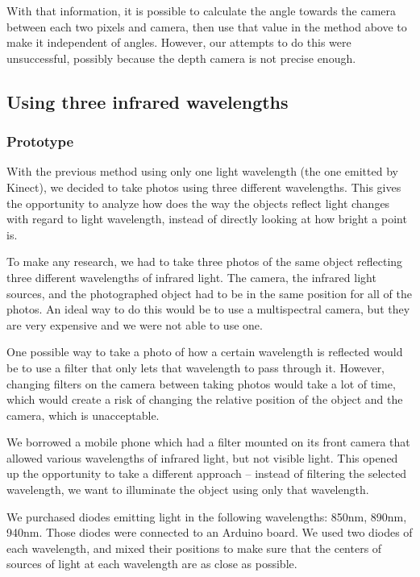             With that information, it is possible to calculate the angle towards the
            camera between each two pixels and camera, then use that value in the method above
            to make it independent of angles.
            However, our attempts to do this were unsuccessful, possibly because the
            depth camera is not precise enough.

        \subsection{Using three infrared wavelengths}
            \subsubsection*{Prototype}
            With the previous method using only one light wavelength (the one emitted by
            Kinect), we decided to take photos using three different wavelengths.
            This gives the opportunity to analyze how does the way the objects reflect
            light changes with regard to light wavelength, instead of directly looking
            at how bright a point is.

            To make any research, we had to take three photos of the same object
            reflecting three different wavelengths of infrared light.
            The camera, the infrared light sources, and the photographed object
            had to be in the same position for all of the photos.
            An ideal way to do this would be to use a multispectral camera, but they are
            very expensive and we were not able to use one.

            One possible way to take a photo of how a certain wavelength is reflected
            would be to use a filter that only lets that wavelength to pass through it.
            However, changing filters on the camera between taking photos would take
            a lot of time, which would create a risk of changing the relative position
            of the object and the camera, which is unacceptable.

            We borrowed a mobile phone which had a filter mounted on its front camera
            that allowed various wavelengths of infrared light, but not visible light.
            This opened up the opportunity to take a different approach -- instead
            of filtering the selected wavelength, we want to illuminate the object
            using only that wavelength.

            We purchased diodes emitting light in the following wavelengths:
            850nm, 890nm, 940nm. Those diodes were connected to an Arduino board.
            We used two diodes of each wavelength, and mixed their positions to
            make sure that the centers of sources of light at each wavelength
            are as close as possible.

